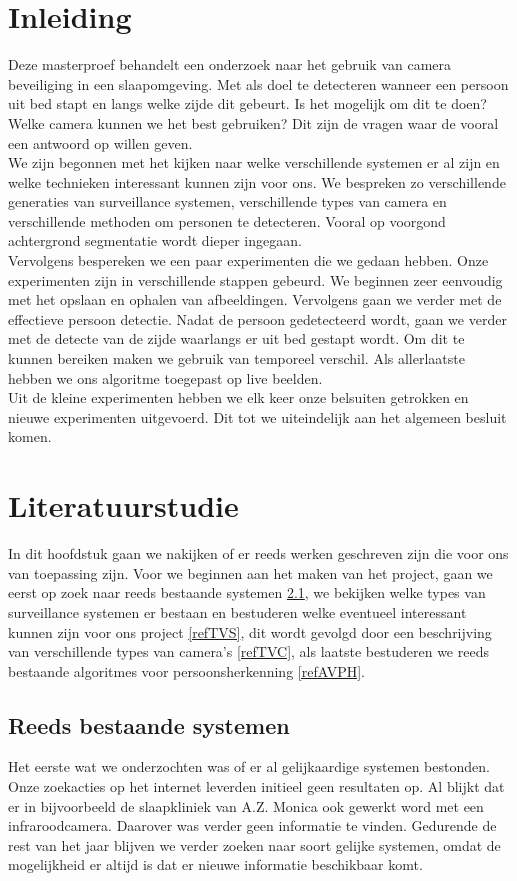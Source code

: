 \chapter{Inleiding}
Deze masterproef behandelt een onderzoek naar het gebruik van camera beveiliging in een slaapomgeving. Met als doel te detecteren wanneer een persoon uit bed stapt en langs welke zijde dit gebeurt. Is het mogelijk om dit te doen? Welke camera kunnen we het best gebruiken? Dit zijn de vragen waar de vooral een antwoord op willen geven. \\
We zijn begonnen met het kijken naar welke verschillende systemen er al zijn en welke technieken interessant kunnen zijn voor ons. We bespreken zo verschillende generaties van surveillance systemen, verschillende types van camera en verschillende methoden om personen te detecteren. Vooral op voorgond achtergrond segmentatie wordt dieper ingegaan. \\
Vervolgens bespereken we een paar experimenten die we gedaan hebben. Onze experimenten zijn in verschillende stappen gebeurd. We beginnen zeer eenvoudig met het opslaan en ophalen van afbeeldingen. Vervolgens gaan we verder met de effectieve persoon detectie. Nadat de persoon gedetecteerd wordt, gaan we verder met de detecte van de zijde waarlangs er uit bed gestapt wordt. Om dit te kunnen bereiken maken we gebruik van temporeel verschil. Als allerlaatste hebben we ons algoritme toegepast op live beelden. \\
Uit de kleine experimenten hebben we elk keer onze belsuiten getrokken en nieuwe experimenten uitgevoerd. Dit tot we uiteindelijk aan het algemeen besluit komen. 

\chapter{Literatuurstudie}
In dit hoofdstuk gaan we nakijken of er reeds werken geschreven zijn die voor ons van toepassing zijn. Voor we beginnen aan het maken van het project, gaan we eerst op zoek naar reeds bestaande systemen \ref{refRBS}, we bekijken welke types van surveillance systemen er bestaan en bestuderen welke eventueel interessant kunnen zijn voor ons project \ref{refTVS}, dit wordt gevolgd door een beschrijving van verschillende types van camera's \ref{refTVC}, als laatste bestuderen we reeds bestaande algoritmes voor persoonsherkenning \ref{refAVPH}.

\section{Reeds bestaande systemen}
\label{refRBS}
Het eerste wat we onderzochten was of er al gelijkaardige systemen bestonden. Onze zoekacties op het internet leverden initieel geen resultaten op. Al blijkt dat er in bijvoorbeeld de slaapkliniek van A.Z. Monica ook gewerkt word met een infraroodcamera. Daarover was verder geen informatie te vinden. Gedurende de rest van het jaar blijven we verder zoeken naar soort gelijke systemen, omdat de mogelijkheid er altijd is dat er nieuwe informatie beschikbaar komt.

